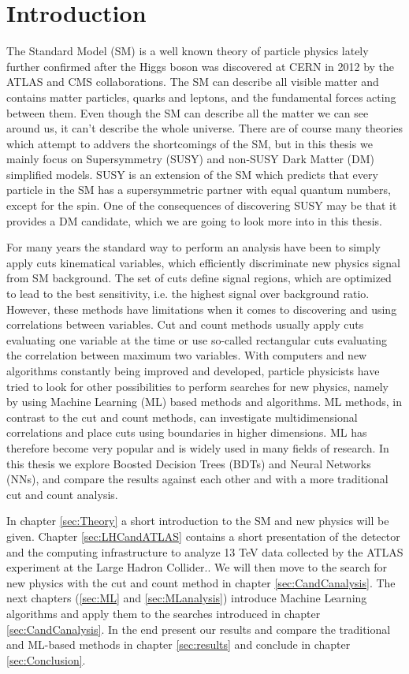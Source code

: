 \chapter*{Introduction}
\label{sec:Introduction}
The Standard Model (SM) \cite{thomson} is a well known theory of particle physics lately further confirmed after the Higgs boson was discovered at CERN in 2012 by the ATLAS \cite{Higgs_ATLAS} and CMS \cite{Higgs_CMS} collaborations. The SM can describe all visible matter and contains matter particles, quarks and leptons, and the fundamental forces acting between them. Even though the SM can describe all the matter we can see around us, it can't describe the whole universe. There are of course many theories which attempt to addvers the shortcomings of the SM, but in this thesis we mainly focus on Supersymmetry (SUSY) and non-SUSY Dark Matter (DM) simplified models. SUSY is an extension of the SM which predicts that every particle in the SM has a supersymmetric partner with equal quantum numbers, except for the spin. One of the consequences of discovering SUSY may be that it provides a DM candidate, which we are going to look more into in this thesis.

For many years the standard way to perform an analysis have been to simply apply cuts kinematical variables, which efficiently discriminate new physics signal from SM background. The set of cuts define signal regions, which are optimized to lead to the best sensitivity, i.e. the highest signal over background ratio. However, these methods have limitations when it comes to discovering and using correlations between variables. Cut and count methods usually apply cuts evaluating one variable at the time or use so-called rectangular cuts evaluating the correlation between maximum two variables. With computers and new algorithms constantly being improved and developed, particle physicists have tried to look for other possibilities to perform searches for new physics, namely by using Machine Learning (ML) based methods and algorithms. ML methods, in contrast to the cut and count methods, can investigate multidimensional correlations and place cuts using boundaries in higher dimensions. ML has therefore become very popular and is widely used in many fields of research. In this thesis we explore Boosted Decision Trees (BDTs) and Neural Networks (NNs), and compare the results against each other and with a more traditional cut and count analysis. 

In chapter \ref{sec:Theory} a short introduction to the SM and new physics will be given. Chapter \ref{sec:LHCandATLAS} contains a short presentation of the detector and the computing infrastructure to analyze 13 TeV data collected by the ATLAS experiment at the Large Hadron Collider.. We will then move to the search for new physics with the cut and count method in chapter \ref{sec:CandCanalysis}. The next chapters (\ref{sec:ML} and \ref{sec:MLanalysis}) introduce Machine Learning algorithms and apply them to the searches introduced in chapter \ref{sec:CandCanalysis}. In the end present our results and compare the traditional and ML-based methods in chapter \ref{sec:results} and conclude in chapter \ref{sec:Conclusion}.


